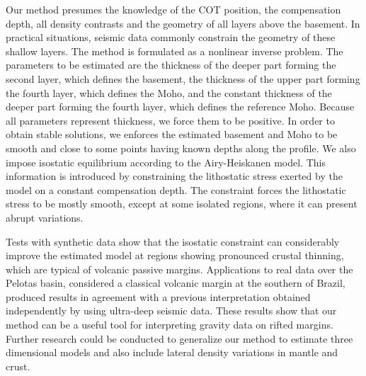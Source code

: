 \documentclass[manuscript]{geophysics}
\begin{document}
Our method presumes the knowledge of the COT position, the compensation depth,
all density contrasts and the geometry of all layers above the basement.
In practical situations, 
seismic data commonly constrain the geometry of these shallow layers.
The method is formulated as a nonlinear inverse problem. 
The parameters to be estimated are the thickness of the deeper part forming the 
second layer, which defines the basement, the thickness of the upper part forming the 
fourth layer, which defines the Moho, and the constant thickness of the deeper part forming 
the fourth layer, which defines the reference Moho.
Because all parameters represent thickness, we force them to be positive.
In order to obtain stable solutions, we enforces the estimated basement and Moho to be 
smooth and close to some points having known depths along the profile.
We also impose isostatic equilibrium according to the Airy-Heiskanen model.
This information is introduced by constraining the lithostatic stress
exerted by the model on a constant compensation depth. The constraint forces the
lithostatic stress to be mostly smooth, except at some isolated regions, where it can
present abrupt variations.

Tests with synthetic data show that the isostatic constraint can considerably improve 
the estimated model at regions showing pronounced crustal thinning, which 
are typical of volcanic passive margins. 
Applications to real data over the Pelotas basin, considered a classical volcanic
margin at the southern of Brazil, produced results in agreement with a previous 
interpretation obtained independently by using ultra-deep seismic data.
These results show that our method can be a useful tool for interpreting
gravity data on rifted margins.
Further research could be conducted to generalize our method to estimate
three dimensional models and also include lateral density variations in 
mantle and crust.

\end{document}
